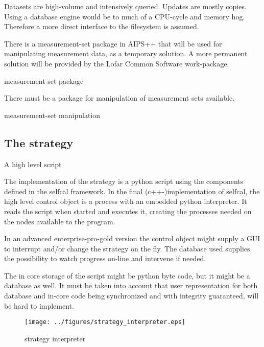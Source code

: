 \documentclass[]{lofar}
\begin{document}
      Datasets are high-volume and intensively queried. Updates are
      mostly copies. Using a database engine would be to much of a
      CPU-cycle and memory hog. Therefore a more direct interface to
      the filesystem is assumed.

      \begin{assumption}
        There is a measurement-set package in AIPS++ that will be used
        for manipulating measurement data, as a temporary solution. A
        more permanent solution will be provided by the Lofar Common
        Software work-package.
        \caption{measurement-set package\label{ass:aips++}}
      \end{assumption}

      \begin{prerequisite}
        There must be a package for manipulation of measurement sets available.
        \caption{measurement-set manipulation\label{pre:aips++}}
      \end{prerequisite}

    \subsection{The strategy}{A high level script}
    \label{subsec:strategy}\hypertarget{subsec:strategy}{}

      The implementation of the strategy is a python script using the
      components defined in the selfcal framework. In the final
      (c++-)implementation of selfcal, the high level control object
      is a process with an embedded python interpreter. It reads the
      script when started and executes it, creating the processes
      needed on the nodes available to the program.

      In an advanced enterprise-pro-gold version the control object
      might supply a GUI to interrupt and/or change the strategy on
      the fly. The database used supplies the possibility to watch
      progress on-line and intervene if needed.

      The in core storage of the script might be python byte code, but
      it might be a database as well. It must be taken into account
      that user representation for both database and in-core code
      being synchronized and with integrity guaranteed, will be hard
      to implement.

      \begin{figure}
        \texttt{[image: ../figures/strategy\_interpreter.eps]}
        \hypertarget{fig:strategy_interpreter}{}
        \caption{strategy interpreter\label{fig:strategy_interpreter}}
      \end{figure}
\end{document}
